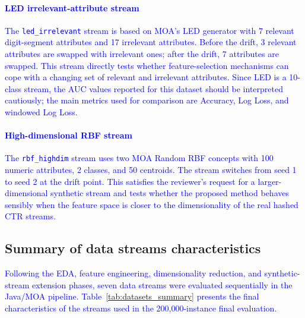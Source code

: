 \documentclass[12pt]{article}
\newcommand{\new}[1]{\textcolor{blue}{#1}}
\begin{document}
\paragraph{\new{LED irrelevant-attribute stream}}
\new{The \texttt{led\_irrelevant} stream is based on MOA's LED generator with 7 relevant digit-segment attributes and 17 irrelevant attributes. Before the drift, 3 relevant attributes are swapped with irrelevant ones; after the drift, 7 attributes are swapped. This stream directly tests whether feature-selection mechanisms can cope with a changing set of relevant and irrelevant attributes. Since LED is a 10-class stream, the AUC values reported for this dataset should be interpreted cautiously; the main metrics used for comparison are Accuracy, Log Loss, and windowed Log Loss.}

\paragraph{\new{High-dimensional RBF stream}}
\new{The \texttt{rbf\_highdim} stream uses two MOA Random RBF concepts with 100 numeric attributes, 2 classes, and 50 centroids. The stream switches from seed 1 to seed 2 at the drift point. This satisfies the reviewer's request for a larger-dimensional synthetic stream and tests whether the proposed method behaves sensibly when the feature space is closer to the dimensionality of the real hashed CTR streams.}


\subsection{Summary of data streams characteristics}
\label{subsec:summ}

\new{Following the EDA, feature engineering, dimensionality reduction, and synthetic-stream extension phases, seven data streams were evaluated sequentially in the Java/MOA pipeline. Table~\ref{tab:datasets_summary} presents the final characteristics of the streams used in the 200,000-instance final evaluation.}
\end{document}
